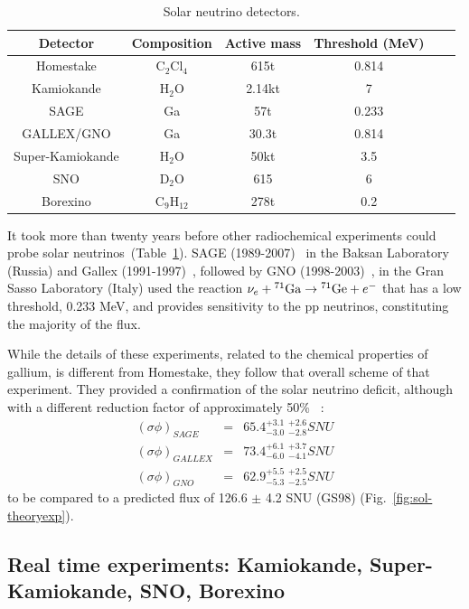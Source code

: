 \begin{table}
\caption{Solar neutrino detectors.}
\centering
\begin{tabular}{|c|c|c|c|c|c|}
  \hline
  Detector & Composition & Active mass & Threshold (MeV)  \\ 
  \hline
Homestake & C$_2$Cl$_4$ & 615t &  0.814 \\
Kamiokande & H$_2$O & 2.14kt &  7  \\
SAGE & Ga & 57t &  0.233 \\
GALLEX/GNO & Ga & 30.3t &  0.814  \\
Super-Kamiokande &  H$_2$O & 50kt &  3.5 \\
SNO & D$_2$O & 615 &  6\\
Borexino & C$_9$H$_{12}$ & 278t &  0.2  \\
  \hline
\end{tabular}

\label{tab:snudet}
\end{table}

It took more than twenty years before other radiochemical experiments could probe solar neutrinos~(Table~\ref{tab:snudet}). SAGE (1989-2007)~\cite{abdurashitov} in the Baksan Laboratory (Russia) and Gallex (1991-1997)~\cite{hampel}, followed by GNO (1998-2003)~\cite{altmann}, in the Gran Sasso Laboratory (Italy) used the reaction  $\nu_e  + {}^{71}{\rm Ga} \rightarrow {}^{71}{\rm Ge} + e^-$
that has a low threshold, 0.233 MeV, and provides sensitivity to the pp neutrinos, constituting the majority of the flux. 

While the details of these experiments, related to the chemical properties of gallium, is different from Homestake, they follow that overall scheme of that experiment. They provided a confirmation of the solar neutrino deficit, although with a different reduction factor of approximately 50\% ~\cite{abdurashitov,hampel,altmann,kaether}:
\begin{eqnarray}
(\sigma \phi)_{SAGE} & = & 65.4^{+3.1} _{-3.0} \; ^{+2.6} _{-2.8}  SNU \\
(\sigma \phi)_{GALLEX} & = & 73.4  ^{+6.1}_{-6.0} \; ^{+3.7} _{-4.1} SNU \\
(\sigma \phi)_{GNO} & = & 62.9  ^{+5.5} _{-5.3} \; ^{+2.5} _{-2.5} SNU 
\end{eqnarray}
to be compared to a predicted flux of 126.6 $\pm$ 4.2 SNU (GS98) (Fig.~\ref{fig:sol-theoryexp}).


\subsection{Real time experiments: Kamiokande, Super-Kamiokande, SNO, Borexino}

